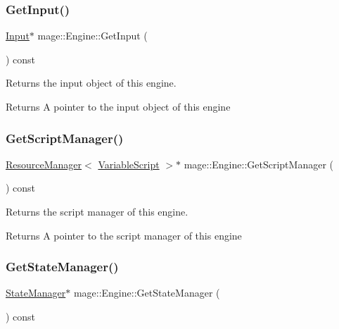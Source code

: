 \subsubsection{\texorpdfstring{Get\+Input()}{GetInput()}}
{\footnotesize\ttfamily \hyperlink{classmage_1_1_input}{Input}$\ast$ mage\+::\+Engine\+::\+Get\+Input (\begin{DoxyParamCaption}{ }\end{DoxyParamCaption}) const}

Returns the input object of this engine.

\begin{DoxyReturn}{Returns}
A pointer to the input object of this engine 
\end{DoxyReturn}
\hypertarget{classmage_1_1_engine_af55c457336dcbc0e940578425c74d868}{}\label{classmage_1_1_engine_af55c457336dcbc0e940578425c74d868} 
\subsubsection{\texorpdfstring{Get\+Script\+Manager()}{GetScriptManager()}}
{\footnotesize\ttfamily \hyperlink{classmage_1_1_resource_manager}{Resource\+Manager}$<$ \hyperlink{classmage_1_1_variable_script}{Variable\+Script} $>$$\ast$ mage\+::\+Engine\+::\+Get\+Script\+Manager (\begin{DoxyParamCaption}{ }\end{DoxyParamCaption}) const}

Returns the script manager of this engine.

\begin{DoxyReturn}{Returns}
A pointer to the script manager of this engine 
\end{DoxyReturn}
\hypertarget{classmage_1_1_engine_a4f35bccc3784de531245a2549d537745}{}\label{classmage_1_1_engine_a4f35bccc3784de531245a2549d537745} 
\subsubsection{\texorpdfstring{Get\+State\+Manager()}{GetStateManager()}}
{\footnotesize\ttfamily \hyperlink{classmage_1_1_state_manager}{State\+Manager}$\ast$ mage\+::\+Engine\+::\+Get\+State\+Manager (\begin{DoxyParamCaption}{ }\end{DoxyParamCaption}) const}

